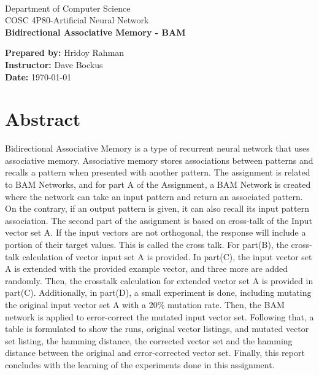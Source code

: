 \documentclass[12pt]{article}
\def \DEPARTEMENT {Department of Computer Science }
\def \COURSENUM {COSC 4P80}
\def \COURSENAME {Artificial Neural Network}
\def \REPORTTITLE {Bidirectional Associative Memory - BAM}
\def \STUDENTNAME {Hridoy Rahman}
\def \INSTRUCTOR {Dave Bockus}
\begin{document}

\begin{titlepage}
    \vfill
    \begin{center}
        \hfill \\
        \Large{\DEPARTEMENT} \\
        \Large{\COURSENUM\;-\;\COURSENAME} \\
        \vfill
        \textbf{\LARGE{\REPORTTITLE}}
    \end{center}
    \vfill
    \begin{flushleft}
        \Large{\textbf{Prepared by:} \STUDENTNAME} \\
        \Large{\textbf{Instructor:} \INSTRUCTOR} \\
        \Large{\textbf{Date:} \today}
    \end{flushleft}
    \vfill
\end{titlepage}

{
\centering
\section*{Abstract}
Bidirectional Associative Memory is a type of recurrent neural network that uses associative memory. Associative memory stores associations between patterns and recalls a pattern when presented with another pattern. The assignment is related to BAM Networks, and for part A of the Assignment, a BAM Network is created where the network can take an input pattern and return an associated pattern.
On the contrary, if an output pattern is given, it can also recall its input pattern association. The second part of the assignment is based on cross-talk of the Input vector set A. If the input vectors are not orthogonal, the response will include a portion of their target values. This is called the cross talk. For part(B), the cross-talk calculation of vector input set A is provided. In part(C), the input vector set A is extended with the provided example vector, and three more are added randomly. Then, the crosstalk calculation for extended vector set A is provided in part(C).
Additionally, in part(D), a small experiment is done, including mutating the original input vector set A with a 20\% mutation rate. Then, the BAM network is applied to error-correct the mutated input vector set. Following that, a table is formulated to show the runs, original vector listings, and mutated vector set listing, the hamming distance, the corrected vector set and the hamming distance between the original and error-corrected vector set. Finally, this report concludes with the learning of the experiments done in this assignment.

\clearpage
}
\end{document}
